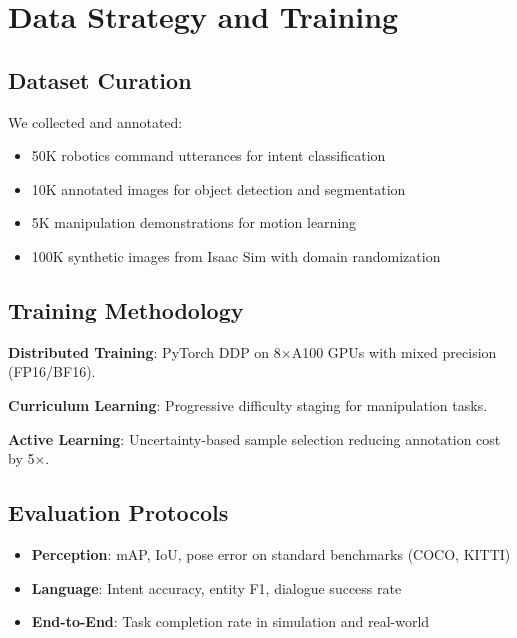 \documentclass[conference]{IEEEtran}
\begin{document}
\section{Data Strategy and Training}
\label{sec:data}

\subsection{Dataset Curation}

We collected and annotated:
\begin{itemize}
    \item 50K robotics command utterances for intent classification
    \item 10K annotated images for object detection and segmentation
    \item 5K manipulation demonstrations for motion learning
    \item 100K synthetic images from Isaac Sim with domain randomization
\end{itemize}

\subsection{Training Methodology}

\textbf{Distributed Training}: PyTorch DDP on 8×A100 GPUs with mixed precision (FP16/BF16).

\textbf{Curriculum Learning}: Progressive difficulty staging for manipulation tasks.

\textbf{Active Learning}: Uncertainty-based sample selection reducing annotation cost by 5×.

\subsection{Evaluation Protocols}

\begin{itemize}
    \item \textbf{Perception}: mAP, IoU, pose error on standard benchmarks (COCO, KITTI)
    \item \textbf{Language}: Intent accuracy, entity F1, dialogue success rate
    \item \textbf{End-to-End}: Task completion rate in simulation and real-world
\end{itemize}

\end{document}
